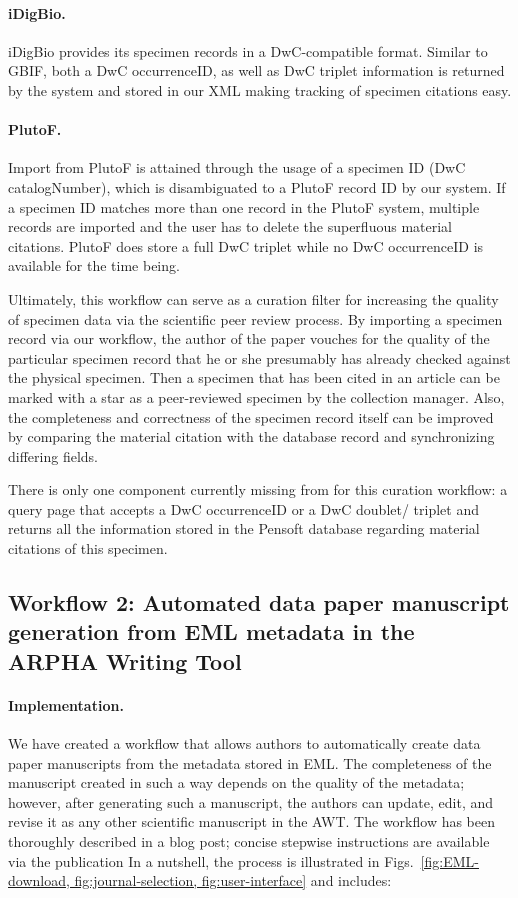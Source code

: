 \paragraph{iDigBio.} iDigBio provides its specimen records in a DwC-compatible format. Similar to GBIF, both a DwC occurrenceID, as well as DwC triplet information is returned by the system and stored in our XML making tracking of specimen citations easy.

\paragraph{PlutoF.} Import from PlutoF is attained through the usage of a specimen ID (DwC catalogNumber), which is disambiguated to a PlutoF record ID by our system. If a specimen ID matches more than one record in the PlutoF system, multiple records are imported and the user has to delete the superfluous material citations. PlutoF does store a full DwC triplet while no DwC occurrenceID is available for the time being.

Ultimately, this workflow can serve as a curation filter for increasing the quality of specimen data via the scientific peer review process. By importing a specimen record via our workflow, the author of the paper vouches for the quality of the particular specimen record that he or she presumably has already checked against the physical specimen. Then a specimen that has been cited in an article can be marked with a star as a peer-reviewed specimen by the collection manager. Also, the completeness and correctness of the specimen record itself can be improved by comparing the material citation with the database record and synchronizing differing fields.

There is only one component currently missing from for this curation workflow: a query page that accepts a DwC occurrenceID or a DwC doublet/ triplet and returns all the information stored in the Pensoft database regarding material citations of this specimen.

\subsection{Workflow 2: Automated data paper manuscript generation from EML metadata in the ARPHA Writing Tool}

\paragraph{Implementation.} We have created a workflow that allows authors to automatically create data paper manuscripts from the metadata stored in EML. The completeness of the manuscript created in such a way depends on the quality of the metadata; however, after generating such a manuscript, the authors can update, edit, and revise it as any other scientific manuscript in the AWT. The workflow has been thoroughly described in a blog post; concise stepwise instructions are available via the publication \cite{penev_arpha-biodiv:_2017} 
In a nutshell, the process is illustrated in Figs.~\ref{fig:EML-download, fig:journal-selection, fig:user-interface} and includes:

